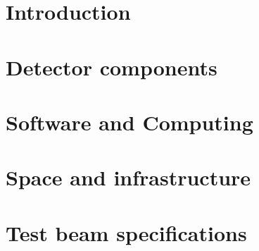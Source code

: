 \documentclass[final]{pd-tdr}
\begin{document}



\chapter{Introduction}


\chapter{Detector components} 


\chapter{Software and Computing}


\chapter{Space and infrastructure}


\chapter{Test beam specifications} 


%

\cleardoublepage


\end{document}
